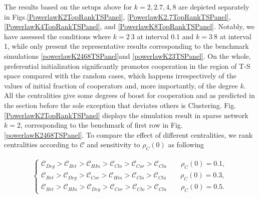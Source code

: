 \documentclass[preprint,12pt,3p]{elsarticle}
\begin{document}
    The results based on the setups above for $k=2,2.7,4,8$ are depicted separately
in Figs.\ref{PowerlawK2TopRankTSPanel}, \ref{PowerlawK2.7TopRankTSPanel},
\ref{PowerlawK4TopRankTSPanel}, and \ref{PowerlawK8TopRankTSPanel}.
Notably, we have assessed the conditions where $k=2~3$ at interval 0.1 and $k=3~8$ at interval 1,
while only present the representative results corresponding to the benchmark simulations \ref{powerlawK2468TSPanel}and \ref{powerlawK23TSPanel}.
    On the whole, preferential initialization significantly promotes cooperation in the region of T-S space
compared with the random cases, which happens irrespectively of the values of initial fraction of cooperators and, more importantly,
of the degree $k$.
All the centralities give some degrees of boost for cooperation and
as predicted in the section before the sole exception that deviates others is Clustering.
    Fig.\ref{PowerlawK2TopRankTSPanel} displays the simulation result in sparse network $k=2$,
corresponding to the benchmark of first row in Fig.\ref{powerlawK2468TSPanel}.
To compare the effect of different centralities, we rank centralities according to $\mathcal{C}$
and sensitivity to $\rho_{C}(0)$ as following

\begin{eqnarray*}
\left\{
\begin{aligned}
\mathcal{C}_{Deg}>\mathcal{C}_{Bet}>\mathcal{C}_{HIn}>\mathcal{C}_{Clo}>\mathcal{C}_{Cor}>\mathcal{C}_{Clu}  \qquad \rho_{C}(0)=0.1,\\
\mathcal{C}_{Bet}>\mathcal{C}_{Deg}>\mathcal{C}_{Cor}>\mathcal{C}_{Hin}>\mathcal{C}_{Clo}>\mathcal{C}_{Clu}  \qquad \rho_{C}(0)=0.3,\\
\mathcal{C}_{Bet}>\mathcal{C}_{HIn}>\mathcal{C}_{Deg}>\mathcal{C}_{Cor}>\mathcal{C}_{Clo}>\mathcal{C}_{Clu}  \qquad \rho_{C}(0)=0.5.
\end{aligned}
\right.
\end{eqnarray*}
\end{document}
